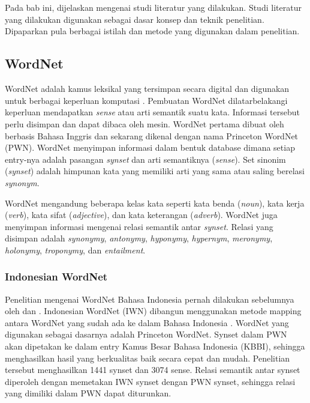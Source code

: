 \chapter{\babDua}
Pada bab ini, dijelaskan mengenai studi literatur yang dilakukan. Studi literatur yang dilakukan digunakan sebagai dasar konsep dan teknik penelitian. Dipaparkan pula berbagai istilah dan metode yang digunakan dalam penelitian.

\section{WordNet}
WordNet adalah kamus leksikal yang tersimpan secara digital dan digunakan untuk berbagai keperluan komputasi \citep{paper.miller}. Pembuatan WordNet dilatarbelakangi keperluan mendapatkan \textit{sense} atau arti semantik suatu kata. Informasi tersebut perlu disimpan dan dapat dibaca oleh mesin. WordNet pertama dibuat oleh \cite{paper.miller} berbasis Bahasa Inggris dan sekarang dikenal dengan nama Princeton WordNet (PWN). WordNet menyimpan informasi dalam bentuk database dimana setiap entry-nya adalah pasangan \textit{synset} dan arti semantiknya (\textit{sense}). Set sinonim (\textit{synset}) adalah himpunan kata yang memiliki arti yang sama atau saling berelasi \textit{synonym}. 

WordNet mengandung beberapa kelas kata seperti kata benda (\textit{noun}), kata kerja (\textit{verb}), kata sifat (\textit{adjective}), dan kata keterangan (\textit{adverb}). WordNet juga menyimpan informasi mengenai relasi semantik antar \textit{synset}. Relasi yang disimpan adalah \textit{synonymy}, \textit{antonymy}, \textit{hyponymy}, \textit{hypernym}, \textit{meronymy}, \textit{holonymy}, \textit{troponymy}, dan \textit{entailment}.

\subsection{Indonesian WordNet}
Penelitian mengenai WordNet Bahasa Indonesia pernah dilakukan sebelumnya oleh \cite{paper.putraarfanmanurung} dan \cite{paper.margarethamanurung}. Indonesian WordNet (IWN) dibangun menggunakan metode mapping antara WordNet yang sudah ada ke dalam Bahasa Indonesia \citep{paper.putraarfanmanurung}. WordNet yang digunakan sebagai dasarnya adalah Princeton WordNet. Synset dalam PWN akan dipetakan ke dalam entry Kamus Besar Bahasa Indonesia (KBBI), sehingga menghasilkan hasil yang berkualitas baik secara cepat dan mudah. Penelitian tersebut menghasilkan 1441 synset dan 3074 sense. Relasi semantik antar synset diperoleh dengan memetakan IWN synset dengan PWN synset, sehingga relasi yang dimiliki dalam PWN dapat diturunkan.

